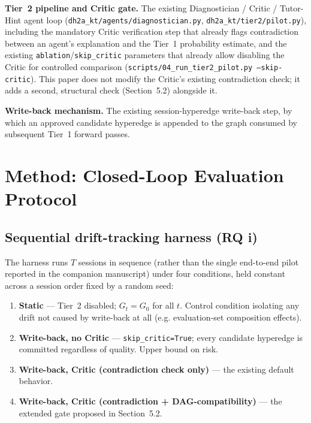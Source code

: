 \documentclass[review,12pt]{elsarticle}
\begin{document}
\textbf{Tier~2 pipeline and Critic gate.} The existing Diagnostician /
Critic / Tutor-Hint agent loop (\texttt{dh2a\_kt/agents/diagnostician.py},
\texttt{dh2a\_kt/tier2/pilot.py}), including the mandatory Critic
verification step that already flags contradiction between an agent's
explanation and the Tier~1 probability estimate, and the existing
\texttt{ablation}/\texttt{skip\_critic} parameters that already allow
disabling the Critic for controlled comparison
(\texttt{scripts/04\_run\_tier2\_pilot.py --skip-critic}). This paper
does not modify the Critic's existing contradiction check; it adds a
second, structural check (Section~5.2) alongside it.

\textbf{Write-back mechanism.} The existing session-hyperedge write-back
step, by which an approved candidate hyperedge is appended to the graph
consumed by subsequent Tier~1 forward passes.

\section{Method: Closed-Loop Evaluation Protocol}

\subsection{Sequential drift-tracking harness (RQ i)}

The harness runs $T$ sessions in sequence (rather than the single
end-to-end pilot reported in the companion manuscript) under four
conditions, held constant across a session order fixed by a random seed:

\begin{enumerate}
\item \textbf{Static} --- Tier~2 disabled; $G_t = G_0$ for all $t$. Control
condition isolating any drift not caused by write-back at all (e.g.
evaluation-set composition effects).
\item \textbf{Write-back, no Critic} --- \texttt{skip\_critic=True}; every
candidate hyperedge is committed regardless of quality. Upper bound on
risk.
\item \textbf{Write-back, Critic (contradiction check only)} --- the
existing default behavior.
\item \textbf{Write-back, Critic (contradiction + DAG-compatibility)} ---
the extended gate proposed in Section~5.2.
\end{enumerate}
\end{document}
